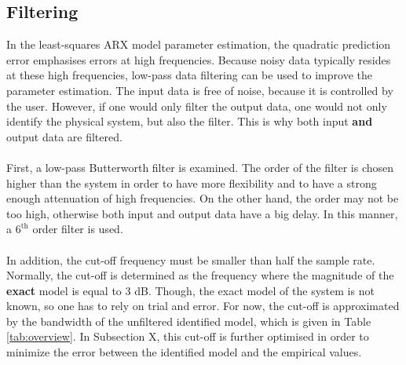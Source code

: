 \documentclass[a4paper,kul]{kulakarticle} %
\begin{document}

\subsection{Filtering}
In the least-squares ARX model parameter estimation, the quadratic prediction error emphasises errors at high frequencies. Because noisy data typically resides at these high frequencies, low-pass data filtering can be used to improve the parameter estimation. The input data is free of noise, because it is controlled by the user. However, if one would only filter the output data, one would not only identify the physical system, but also the filter. This is why both input \textbf{and} output data are filtered. 
\\\\
First, a low-pass Butterworth filter is examined. The order of the filter is chosen higher than the system in order to have more flexibility and to have a strong enough attenuation of high frequencies. On the other hand, the order may not be too high, otherwise both input and output data have a big delay. In this manner, a $6^{\text{th}}$ order filter is used. 
\\\\
In addition, the cut-off frequency must be smaller than half the sample rate. Normally, the cut-off is determined as the frequency where the magnitude of the \textbf{exact} model is equal to 3 dB. Though, the exact model of the system is not known, so one has to rely on trial and error. For now, the cut-off is approximated by the bandwidth of the unfiltered identified model, which is given in Table \ref{tab:overview}. In Subsection X, this cut-off is further optimised in order to minimize the error between the identified model and the empirical values.
\end{document}
